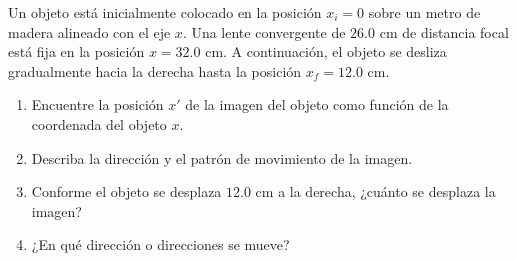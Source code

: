 \item Un objeto está inicialmente colocado en la posición $x_i = 0$ sobre un metro de madera alineado con el eje $x$. Una lente convergente de $26.0\text{ cm}$ de distancia focal está fija en la posición $x = 32.0\text{ cm}$. A continuación, el objeto se desliza gradualmente hacia la derecha hasta la posición $x_f = 12.0\text{ cm}$.
\begin{enumerate}
    \item Encuentre la posición $x'$ de la imagen del objeto como función de la coordenada del objeto $x$.
    \item Describa la dirección y el patrón de movimiento de la imagen.
    \item Conforme el objeto se desplaza $12.0\text{ cm}$ a la derecha, ¿cuánto se desplaza la imagen?
    \item ¿En qué dirección o direcciones se mueve?
\end{enumerate}